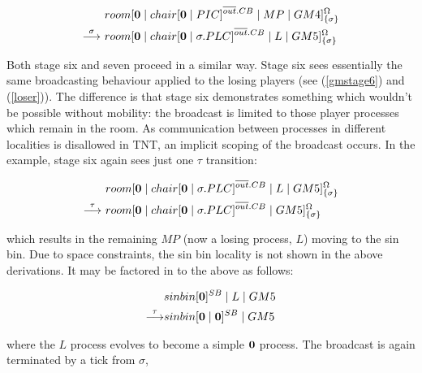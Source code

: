 \begin{equation}
\begin{aligned}
&  {room}[ \textbf{0} \;|\; {chair}[ \textbf{0} \;|\; PIC ]^{\overline{out}.CB} \;|\; 
   MP \;|\;
   GM4 ]^{\Omega}_{\{\sigma\}} \\
\stackrel{\sigma}{\longrightarrow}\ & {room}[ \textbf{0} \;|\; {chair}[ \textbf{0} \;|\; \sigma.PLC ]^{\overline{out}.CB} \;|\; 
   L \;|\;
   GM5 ]^{\Omega}_{\{\sigma\}} \\
\end{aligned}
\end{equation}

Both stage six and seven proceed in a similar way.  Stage six sees
essentially the same broadcasting behaviour applied to the losing
players (see (\ref{gmstage6}) and (\ref{loser})).  The difference is
that stage six demonstrates something which wouldn't be possible without
mobility: the broadcast is limited to those player processes which
remain in the room.  As communication between processes in different
localities is disallowed in TNT, an implicit scoping of the broadcast
occurs.  In the example, stage six again sees just one $\tau$
transition:

\begin{equation}
\begin{aligned}
&  {room}[ \textbf{0} \;|\; {chair}[ \textbf{0} \;|\; \sigma.PLC ]^{\overline{out}.CB} \;|\; 
   L \;|\;
   GM5 ]^{\Omega}_{\{\sigma\}} \\
\stackrel{\tau}{\longrightarrow}\ & {room}[ \textbf{0} \;|\; {chair}[ \textbf{0} \;|\; \sigma.PLC ]^{\overline{out}.CB} \;|\;
   GM5 ]^{\Omega}_{\{\sigma\}} \\
\end{aligned}
\end{equation}

\noindent which results in the remaining $MP$ (now a losing
process, $L$) moving to the sin bin.  Due to space constraints, the sin bin
locality is not shown in the above derivations.  It may be factored in
to the above as follows:

\begin{equation}
\begin{aligned}
& {sinbin}[ \textbf{0} ]^{SB} \;|\; L \;|\; GM5 \\
\stackrel{\tau}{\longrightarrow} & {sinbin}[ \textbf{0} \;|\; \textbf{0} ]^{SB} \;|\; GM5
\end{aligned}
\end{equation}

\noindent where the $L$ process evolves to become a simple $\textbf{0}$
process.  The broadcast is again terminated by a tick from $\sigma$,

